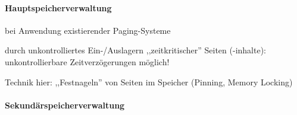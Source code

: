 \documentclass[a4paper]{article}
\begin{document}
\begin{multicols}{3}
    \paragraph{Hauptspeicherverwaltung}

    \begin{itemize*}
        \item bei Anwendung existierender Paging-Systeme
        \begin{itemize*}
            \item durch unkontrolliertes Ein-/Auslagern ,,zeitkritischer'' Seiten (-inhalte): unkontrollierbare Zeitverzögerungen möglich!
            \item Technik hier: ,,Festnageln'' von Seiten im Speicher (Pinning, Memory Locking)
        \end{itemize*}
    \end{itemize*}


    \paragraph{Sekundärspeicherverwaltung}


\end{multicols}
\end{document}
